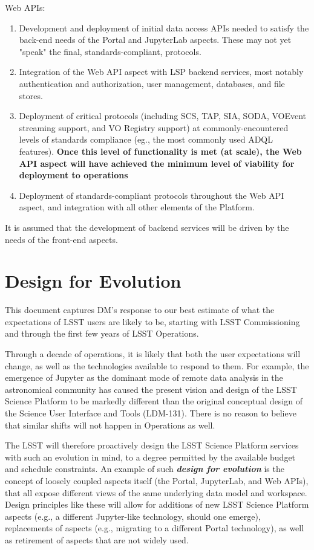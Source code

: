 \documentclass[DM,lsstdraft,toc]{lsstdoc}
\begin{document}
Web APIs:
\begin{enumerate}
	\item Development and deployment of initial data access APIs needed to satisfy the back-end needs of the Portal and JupyterLab aspects. These may not yet "speak" the final, standards-compliant, protocols.
	\item Integration of the Web API aspect with LSP backend services, most notably authentication and authorization, user management, databases, and file stores.
	\item Deployment of critical protocols (including SCS, TAP, SIA, SODA, VOEvent streaming support, and VO Registry support) at commonly-encountered levels of standards compliance (eg., the most commonly used ADQL features). \textbf{Once this level of functionality is met (at scale), the Web API aspect will have achieved the minimum level of viability for deployment to operations}
	\item Deployment of standards-compliant protocols throughout the Web API aspect, and integration with all other elements of the Platform.
\end{enumerate}

It is assumed that the development of backend services will be driven by the needs of the front-end aspects.

\section{Design for Evolution}

This document captures DM's response to our best estimate of what the expectations of LSST users are likely to be, starting with LSST Commissioning and through the first few years of LSST Operations.

Through a decade of operations, it is likely that both the user expectations will change, as well as the technologies available to respond to them. For example, the emergence of Jupyter as the dominant mode of remote data analysis in the astronomical community has caused the present vision and design of the LSST Science Platform to be markedly different than the original conceptual design of the Science User Interface and Tools (LDM-131). There is no reason to believe that similar shifts will not happen in Operations as well.

The LSST will therefore proactively design the LSST Science Platform services with such an evolution in mind, to a degree permitted by the available budget and schedule constraints. An example of such \textbf\emph{design for evolution} is the concept of loosely coupled aspects itself (the Portal, JupyterLab, and Web APIs), that all expose different views of the same underlying data model and workspace. Design principles like these will allow for additions of new LSST Science Platform aspects (e.g., a different Jupyter-like technology, should one emerge), replacements of aspects (e.g., migrating to a different Portal technology), as well as retirement of aspects that are not widely used.

\clearpage


\end{document}

